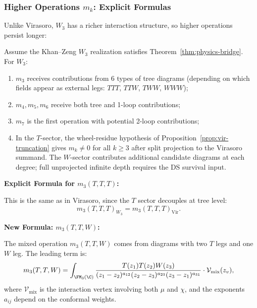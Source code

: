 \subsubsection{Higher Operations $m_k$: Explicit Formulas}

Unlike Virasoro, $W_3$ has a richer interaction structure, so higher operations persist longer:

\begin{proposition}
Assume the Khan--Zeng $W_3$ realization satisfies
Theorem~\ref{thm:physics-bridge}.
For $W_3$:
\begin{enumerate}
\item $m_3$ receives contributions from 6 types of tree diagrams (depending on which fields appear as external legs: $TTT$, $TTW$, $TWW$, $WWW$);
\item $m_4, m_5, m_6$ receive both tree and 1-loop contributions;
\item $m_7$ is the first operation with potential 2-loop contributions;
\item In the $T$-sector, the wheel-residue hypothesis of
Proposition~\ref{prop:vir-truncation} gives
$m_k \neq 0$ for all $k \geq 3$ after split projection to the
Virasoro summand. The $W$-sector contributes additional candidate
diagrams at each degree; full unprojected infinite depth requires the
DS survival input.
\end{enumerate}
\end{proposition}

\textbf{Explicit Formula for $m_3(T,T,T)$:}

This is the same as in Virasoro, since the $T$ sector decouples at tree level:
\begin{equation}
m_3(T,T,T)_{W_3} = m_3(T,T,T)_{\text{Vir}}.
\end{equation}

\textbf{New Formula: $m_3(T,T,W)$:}

The mixed operation $m_3(T,T,W)$ comes from diagrams with two $T$ legs and one $W$ leg. The leading term is:
\begin{equation}
m_3(T,T,W) = \int_{\FM_3(\C)} \frac{T(z_1) T(z_2) W(z_3)}{(z_1-z_2)^{a_{12}} (z_2-z_3)^{a_{23}} (z_3-z_1)^{a_{31}}} \cdot \mathcal{V}_{\text{mix}}(z_v),
\end{equation}
where $\mathcal{V}_{\text{mix}}$ is the interaction vertex involving both $\mu$ and $\chi$, and the exponents $a_{ij}$ depend on the conformal weights.


